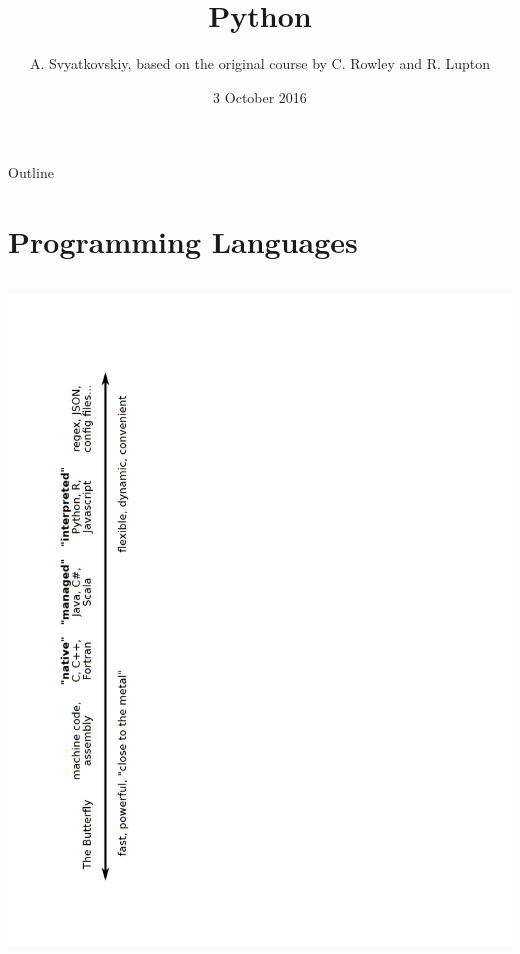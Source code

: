 \documentclass[10pt, t]{beamer}
\author{A. Svyatkovskiy, based on the original course by C. Rowley and R. Lupton}
\date{3 October 2016}
\title{Python}
\begin{document}
\maketitle
\begin{frame}{Outline}
\tableofcontents
\end{frame}


\section{Programming Languages}
\label{sec-1}
\begin{frame}{} %
\begin{columns}
\includegraphics[angle=-90,width=\linewidth]{figures/languages1.pdf}
\end{columns}
\end{frame}
\end{document}
